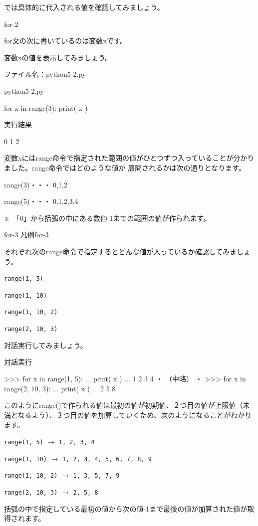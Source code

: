\documentclass[11pt,a4paper,dvipdfmx,titlepage]{jsreport}
\begin{document}
では具体的に代入される値を確認してみましょう。
\begin{pabox}{for-2}

for文の次に書いているのは変数xです。


変数xの値を表示してみましょう。

ファイル名：python5-2.py

\begin{legbox}{python5-2.py}
\begin{listing}{1}
for x in range(3):
    print( x )
\end{listing}

実行結果
\begin{listing}{1}
0
1
2
\end{listing}
\end{legbox}
\end{pabox}
変数xにはrange命令で指定された範囲の値がひとつずつ入っていることが分かりました。range命令ではどのような値が
展開されるかは次の通りとなります。
\begin{description}
\item range(3)・・・ 0,1,2
\item range(5)・・・ 0,1,2,3,4
\end{description}
※　「0」から括弧の中にある数値-1までの範囲の値が作られます。

\begin{pabox}{for-3}
凡例for-3

それぞれ次のrange命令で指定するとどんな値が入っているか確認してみましょう。
\begin{description}
\item {\tt range(1, 5)}
\item {\tt range(1, 10)}
\item {\tt range(1, 10, 2)}
\item {\tt range(2, 10, 3)}
\end{description}
 {\gt 対話実行}してみましょう。

\begin{legbox}{対話実行}
\begin{listing}{1}
>>> for x in range(1, 5):
...     print( x )
...
1
2
3
4
	・
	（中略）
	・
>>> for x in range(2, 10, 3):
...     print( x )
...
2
5
8
\end{listing}
\end{legbox}
\end{pabox}
このようにrange()で作られる値は最初の値が初期値、２つ目の値が上限値（未満となるよう）、３つ目の値を加算していくため、次のようになることがわかります。
\begin{description}
\item {\tt range(1, 5)} $\rightarrow$ {\tt 1, 2, 3, 4}
\item {\tt range(1, 10)}	$\rightarrow$	{\tt 1, 2, 3, 4, 5, 6, 7, 8, 9}
\item {\tt range(1, 10, 2)}	$\rightarrow$ {\tt 1, 3, 5, 7, 9}
\item {\tt range(2, 10, 3)}	$\rightarrow$ {\tt 2, 5, 8}
\end{description}
括弧の中で指定している最初の値から次の値-1まで最後の値が加算された値が取得されます。
\end{document}
